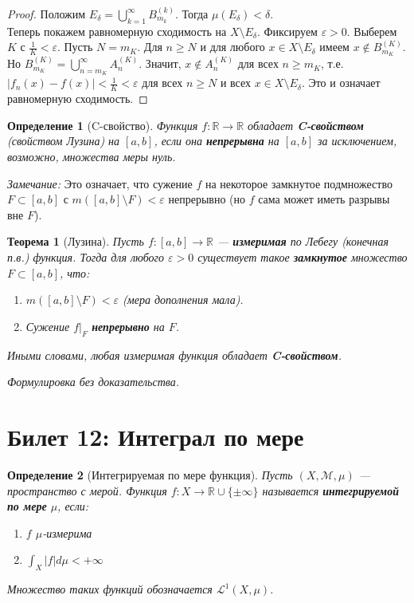 \documentclass[a4paper, 12pt]{article}
\newtheorem{definition}{Определение}
\newtheorem{theorem}{Теорема}
\newcommand{\R}{\mathbb{R}}
\newcommand{\1}{\mathbf{1}}
\begin{document}
\begin{proof}
    Положим $E_\delta = \bigcup_{k=1}^{\infty} B_{m_k}^{(k)}$. Тогда $\mu(E_\delta) < \delta$. \\
    Теперь покажем равномерную сходимость на $X \setminus E_\delta$. Фиксируем $\varepsilon > 0$. Выберем $K$ с $\frac{1}{K} < \varepsilon$. Пусть $N = m_K$. Для $n \geq N$ и для любого $x \in X \setminus E_\delta$ имеем $x \notin B_{m_K}^{(K)}$. Но $B_{m_K}^{(K)} = \bigcup_{n=m_K}^{\infty} A_n^{(K)}$. Значит, $x \notin A_n^{(K)}$ для всех $n \geq m_K$, т.е. $|f_n(x) - f(x)| < \frac{1}{K} < \varepsilon$ для всех $n \geq N$ и всех $x \in X \setminus E_\delta$. Это и означает равномерную сходимость.
\end{proof}

\begin{definition}[C-свойство]
    Функция $f: \R \to \R$ обладает \textbf{C-свойством} (свойством Лузина) на $[a,b]$, если она \textbf{непрерывна} на $[a,b]$ за исключением, возможно, множества меры нуль.
\end{definition}
\textit{Замечание:} Это означает, что сужение $f$ на некоторое замкнутое подмножество $F \subset [a,b]$ с $m([a,b] \setminus F) < \varepsilon$ непрерывно (но $f$ сама может иметь разрывы вне $F$).

\begin{theorem}[Лузина]
    Пусть $f: [a,b] \to \R$ — \textbf{измеримая} по Лебегу (конечная п.в.) функция. Тогда для любого $\varepsilon > 0$ существует такое \textbf{замкнутое} множество $F \subset [a,b]$, что:
    \begin{enumerate}[label=(\roman*)]
        \item $m([a,b] \setminus F) < \varepsilon$ (мера дополнения мала).
        \item Сужение $f|_F$ \textbf{непрерывно} на $F$.
    \end{enumerate}
    Иными словами, любая измеримая функция обладает \textbf{C-свойством}.
\end{theorem}
\textit{Формулировка без доказательства.}

\section*{Билет 12: Интеграл по мере}
\begin{definition}[Интегрируемая по мере функция]
    Пусть $(X, \mathcal{M}, \mu)$ — пространство с мерой. Функция $f: X \to \R \cup \{\pm\infty\}$ называется \textbf{интегрируемой по мере} $\mu$, если:
    \begin{enumerate}
        \item $f$ $\mu$-измерима
        \item $\int_X |f|  d\mu < +\infty$
    \end{enumerate}
    Множество таких функций обозначается $\mathcal{L}^1(X, \mu)$.
\end{definition}
\end{document}
